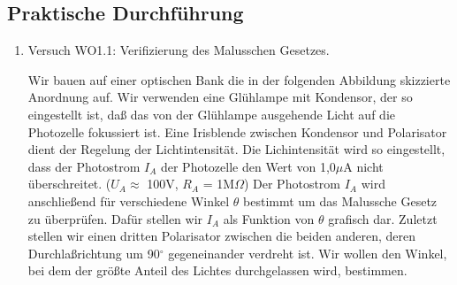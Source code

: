 \documentclass[12pt]{scrartcl}
\begin{document}
\subsection{Praktische Durchführung}
\begin{enumerate}
\item Versuch WO1.1: Verifizierung des Malusschen Gesetzes.\\
\begin{enumerate}
Wir bauen auf einer optischen Bank die in 
der folgenden Abbildung skizzierte Anordnung auf.
Wir verwenden eine Glühlampe mit Kondensor, der so eingestellt ist, daß das von der Glühlampe ausgehende Licht auf die Photozelle fokussiert ist. Eine Irisblende zwischen Kondensor und Polarisator dient der Regelung der Lichtintensität. Die
Lichintensität wird so eingestellt, dass der Photostrom $I_A$ der Photozelle 
den Wert von 1,0$\mu$A nicht überschreitet. ($U_A \approx$ 100V, $R_A$ = 1M$\Omega$) Der Photostrom $I_A$ wird anschließend für verschiedene Winkel $\theta$ bestimmt um das Malussche Gesetz zu überprüfen.
Dafür stellen wir $I_A$ als Funktion von $\theta$ grafisch dar.
Zuletzt stellen wir einen dritten Polarisator zwischen die beiden anderen, deren Durchlaßrichtung
um 90$^\circ$ gegeneinander verdreht ist. Wir wollen den Winkel, bei dem der größte Anteil des Lichtes durchgelassen wird, bestimmen.


\end{enumerate}
\end{enumerate}
\end{document}
